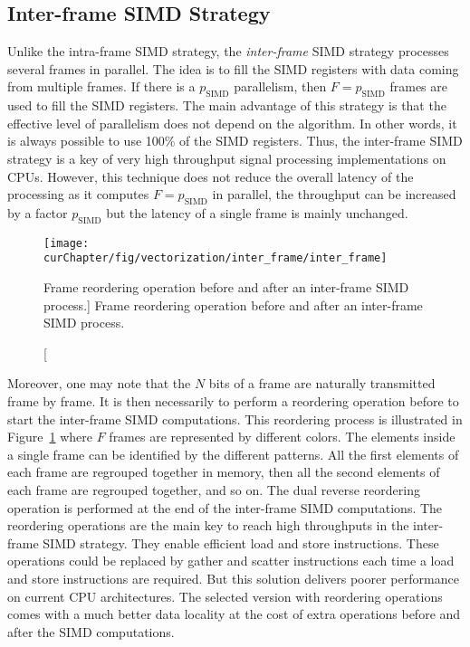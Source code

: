 \subsection{Inter-frame SIMD Strategy}
\label{sec:opt_vec_inter}

Unlike the intra-frame SIMD strategy, the \emph{inter-frame} SIMD strategy
processes several frames in parallel. The idea is to fill the SIMD registers
with data coming from multiple frames. If there is a $p_\text{SIMD}$
parallelism, then $F = p_\text{SIMD}$ frames are used to fill the SIMD
registers. The main advantage of this strategy is that the effective level of
parallelism does not depend on the algorithm. In other words, it is always
possible to use 100\% of the SIMD registers. Thus, the inter-frame SIMD strategy
is a key of very high throughput signal processing implementations on CPUs.
However, this technique does not reduce the overall latency of the processing as
it computes $F = p_\text{SIMD}$ in parallel, the throughput can be increased by
a factor $p_\text{SIMD}$ but the latency of a single frame is mainly unchanged.

\begin{figure}[htp]
  \centering
  \texttt{[image: \\curChapter/fig/vectorization/inter\_frame/inter\_frame]}
  \caption
    [Frame reordering operation before and after an inter-frame SIMD process.]
    {Frame reordering operation before and after an inter-frame SIMD process.}
  \label{fig:opt_vec_inter_frame}
\end{figure}

Moreover, one may note that the $N$ bits of a frame are naturally transmitted
frame by frame. It is then necessarily to perform a reordering operation before
to start the inter-frame SIMD computations. This reordering process is
illustrated in Figure~\ref{fig:opt_vec_inter_frame} where $F$ frames are
represented by different colors. The elements inside a single frame can be
identified by the different patterns. All the first elements of each frame are
regrouped together in memory, then all the second elements of each frame are
regrouped together, and so on. The dual reverse reordering operation is
performed at the end of the inter-frame SIMD computations. The reordering
operations are the main key to reach high throughputs in the inter-frame SIMD
strategy. They enable efficient load and store instructions. These operations
could be replaced by gather and scatter instructions each time a load and store
instructions are required. But this solution delivers poorer performance on
current CPU architectures. The selected version with reordering operations comes
with a much better data locality at the cost of extra operations before and
after the SIMD computations.

